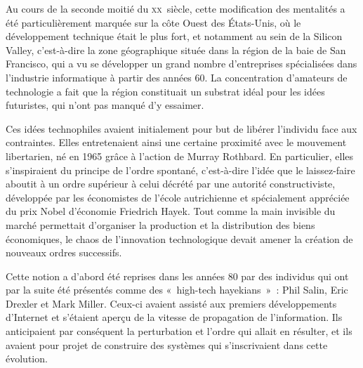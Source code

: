 
Au cours de la seconde moitié du \textsc{xx}\ieme{}~siècle, cette modification des mentalités a été particulièrement marquée sur la côte Ouest des États-Unis, où le développement technique était le plus fort, et notamment au sein de la Silicon Valley, c'est-à-dire la zone géographique située dans la région de la baie de San Francisco, qui a vu se développer un grand nombre d'entreprises spécialisées dans l'industrie informatique à partir des années 60. La concentration d'amateurs de technologie a fait que la région constituait un substrat idéal pour les idées futuristes, qui n'ont pas manqué d'y essaimer.

Ces idées technophiles avaient initialement pour but de libérer l'individu face aux contraintes. Elles entretenaient ainsi une certaine proximité avec le mouvement libertarien, né en 1965 grâce à l'action de Murray Rothbard. En particulier, elles s'inspiraient du principe de l'ordre spontané, c'est-à-dire l'idée que le laissez-faire aboutit à un ordre supérieur à celui décrété par une autorité constructiviste, développée par les économistes de l'école autrichienne et spécialement appréciée du prix Nobel d'économie Friedrich Hayek. Tout comme la main invisible du marché permettait d'organiser la production et la distribution des biens économiques, le chaos de l'innovation technologique devait amener la création de nouveaux ordres successifs.

Cette notion a d'abord été reprises dans les années 80 par des individus qui ont par la suite été présentés comme des «~high-tech hayekians~»~: Phil Salin, Eric Drexler et Mark Miller. Ceux-ci avaient assisté aux premiers développements d'Internet et s'étaient aperçu de la vitesse de propagation de l'information. Ils anticipaient par conséquent la perturbation et l'ordre qui allait en résulter, et ils avaient pour projet de construire des systèmes qui s'inscrivaient dans cette évolution. %

